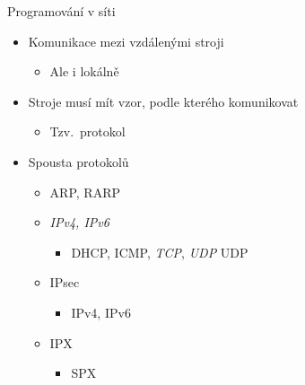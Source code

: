 
\begin{frame}{Programování v síti}

  \begin{itemize}
    \item Komunikace mezi vzdálenými stroji
    \begin{itemize}
      \item Ale i lokálně
    \end{itemize}

    \pause

    \item Stroje musí mít vzor, podle kterého komunikovat
    \begin{itemize}
      \item Tzv.\ protokol
    \end{itemize}

    \pause

    \item Spousta protokolů
    \begin{itemize}
      \item ARP, RARP
      \item \emph{IPv4, IPv6}
      \begin{itemize}
	\item DHCP, ICMP, \emph{TCP}, \ifpcdirlinuxb \emph{UDP} \else UDP \fi
      \end{itemize}

      \item IPsec
      \begin{itemize}
	\item IPv4, IPv6
      \end{itemize}

      \item IPX
      \begin{itemize}
	\item SPX
      \end{itemize}
    \end{itemize}
  \end{itemize}

\end{frame}

\ifpcdirlinuxb



